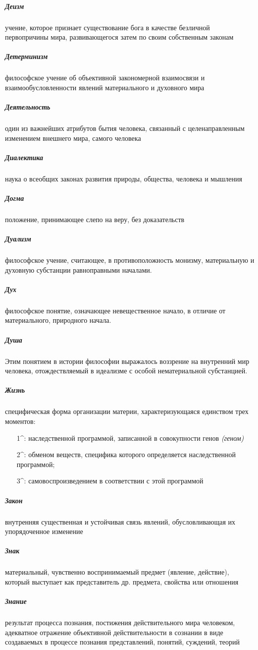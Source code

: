 \documentclass[a4paper, 12pt]{article}
\theoremstyle{plain} %
\theoremstyle{definition} %
\theoremstyle{remark} %
\begin{document}
\subparagraph{Деизм}
	учение, которое признает существование бога в качестве безличной первопричины мира, развивающегося затем по своим собственным законам

\subparagraph{Детерминизм}
	философское учение об объективной закономерной взаимосвязи и взаимообусловленности явлений материального и духовного мира

\subparagraph{Деятельность}
	один из важнейших атрибутов бытия человека, связанный с целенаправленным изменением внешнего мира, самого человека

\subparagraph{Диалектика}
	наука о всеобщих законах развития природы, общества, человека и мышления

\subparagraph{Догма}
	 положение, принимающее слепо на веру, без доказательств

\subparagraph{Дуализм}
	философское учение, считающее, в противоположность монизму, материальную и духовную субстанции равноправными началами.

\subparagraph{Дух}
	философское понятие, означающее невещественное начало, в отличие от материального, природного начала.

\subparagraph{Душа}
	Этим понятием в истории философии выражалось воззрение на внутренний мир человека, отождествляемый в идеализме с особой нематериальной субстанцией.

\subparagraph{Жизнь}
	специфическая форма организации материи, характеризующаяся единством трех моментов:
	\begin{itemize}
		\item[1^\circ:] наследственной программой, записанной в совокупности генов \emph{(геном)}
		\item[2^\circ:] обменом веществ, специфика которого определяется наследственной программой;
		\item[3^\circ:] самовоспроизведением в соответствии с этой программой
	\end{itemize}

\subparagraph{Закон}
	внутренняя существенная и устойчивая связь явлений, обусловливающая их упорядоченное изменение

\subparagraph{Знак}
	материальный, чувственно воспринимаемый предмет (явление, действие), который выступает как представитель др. предмета, свойства или отношения

\subparagraph{Знание}
	результат процесса познания, постижения действительного мира человеком, адекватное отражение объективной действительности в сознании в виде создаваемых в процессе познания представлений, понятий, суждений, теорий
\end{document}

